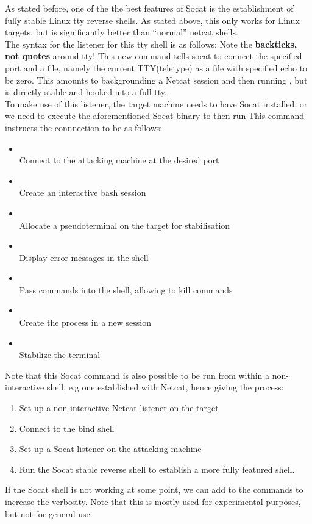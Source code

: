 \documentclass[../../WriteUp.tex]{subfiles}
\begin{document}
{As stated before, one of the the best features of Socat is the establishment of fully stable Linux tty reverse shells. As stated above, this only works for Linux targets, but is significantly better than ``normal'' netcat shells. \\
The syntax for the listener for this tty shell is as follows:
Note the \textbf{backticks, not quotes} around tty!
This new command tells socat to connect the specified port and a file, namely the current TTY(teletype) as a file with specified echo to be zero. This amounts to backgrounding a Netcat session and then running , but is directly stable and hooked into a full tty.\\
To make use of this listener, the target machine needs to have Socat installed, or we need to execute the aforementioned Socat binary to then run 
This command instructs the connnection to be as follows: 
\begin{itemize}
\item {}\\
Connect to the attacking machine at the desired port
\item {}\\
Create an interactive bash session
\item {}\\
Allocate a pseudoterminal on the target for stabilisation
\item {}\\
Display error messages in the shell
\item {}\\
Pass  commands into the shell, allowing to kill commands
\item {}\\
Create the process in a new session
\item {}\\
Stabilize the terminal
\end{itemize}
Note that this Socat command is also possible to be run from within a non-interactive shell, e.g one established with Netcat, hence giving the process: 
\begin{enumerate}
\item Set up a non interactive Netcat listener on the target
\item Connect to the bind shell
\item Set up a Socat listener on the attacking machine
\item Run the Socat stable reverse shell to establish a more fully featured shell.
\end{enumerate}
If the Socat shell is not working at some point, we can add  to the commands to increase the verbosity. Note that this is mostly used for experimental purposes, but not for general use.
}
\end{document}
